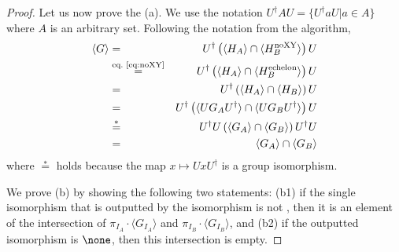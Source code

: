 \begin{proof}
    Let us now prove the (a).
    We use the notation $U^{\dagger} A U = \{U^{\dagger} a U | a \in A\}$ where $A$ is an arbitrary set.
    Following the notation from the algorithm,
    \begin{eqnarray*}
        \langle G\rangle
        &=&
        U^{\dagger} \left(
        \langle H_A \rangle \cap \langle H_B^{\textnormal{noXY}}\rangle
        \right) U
        \\
        &\stackrel{\textnormal{eq.~\eqref{eq:noXY}}}{=}&
        U^{\dagger} \left(
        \langle H_A \rangle \cap \langle H_B^{\textnormal{echelon}}\rangle
        \right) U
        \\
        &=&
        U^{\dagger} \left(
        \langle H_A \rangle \cap \langle H_B\rangle
        \right) U
        \\
        &=&
        U^{\dagger} \left(
        \langle U G_A U^{\dagger} \rangle \cap \langle U G_B U^{\dagger}\rangle
        \right) U
        \\
        &\stackrel{*}{=}&
        U^{\dagger} U \left(
        \langle G_A \rangle \cap \langle G_B\rangle
        \right) U^{\dagger} U
        \\
        &=&
        \langle G_A \rangle \cap \langle G_B\rangle
    \end{eqnarray*}
    where $\stackrel{*}{=}$ holds because the map $x \mapsto Ux U^{\dagger}$ is a group isomorphism.

    We prove (b) by showing the following two statements: (b1) if the single isomorphism that is outputted by the isomorphism is not \none, then it is an element of the intersection of $\pi_{I_A} \cdot \langle G_{I_A} \rangle$ and $\pi_{I_B} \cdot \langle G_{I_B} \rangle$, and (b2) if the outputted isomorphism is $\none$, then this intersection is empty.


\end{proof}
